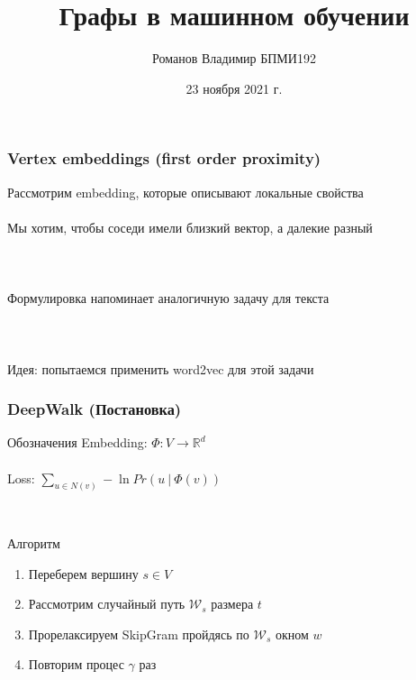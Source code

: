 \documentclass{beamer}
\title{Графы в машинном обучении}
\author[Романов Владимир]{Романов Владимир БПМИ192}
\institute[ВШЭ]{Национальный исследовательский университет \\ «Высшая школа экономики» (Москва)}
\date{23 ноября 2021 г.}
\newcommand{\R}{\mathbb{R}}
\newcommand{\skipline}[0]{$ $\\}
\begin{document}
\frame{\titlepage}





\begin{frame}
    \frametitle{Vertex embeddings (first order proximity)}
    Рассмотрим embedding, которые описывают локальные свойства
    \skipline
    \skipline
    Мы хотим, чтобы соседи имели близкий вектор, а далекие разный
    \skipline
    \skipline
    \skipline
    \skipline
    Формулировка напоминает аналогичную задачу для текста
    \skipline
    \skipline
    \skipline
    \skipline
    Идея: попытаемся применить word2vec для этой задачи
\end{frame}

\begin{frame}
    \frametitle{DeepWalk (Постановка)}

    \begin{block}{Обозначения}
        Embedding: $\varPhi: V \to \R^d$ 
        \skipline
        \skipline
        Loss: $\sum_{u \in N(v)} -\ln Pr\left(u \ \vert\ \varPhi(v)\right)$
    \end{block}
    \skipline
    \begin{block}{Алгоритм}
        \begin{enumerate}
            \item Переберем вершину $s \in V$
            \item Рассмотрим случайный путь $\mathcal{W}_s$ размера $t$
            \item Прорелаксируем SkipGram пройдясь по $\mathcal{W}_s$ окном $w$
            \item Повторим процес $\gamma$ раз
        \end{enumerate}
    \end{block}
\end{frame}
\end{document}
